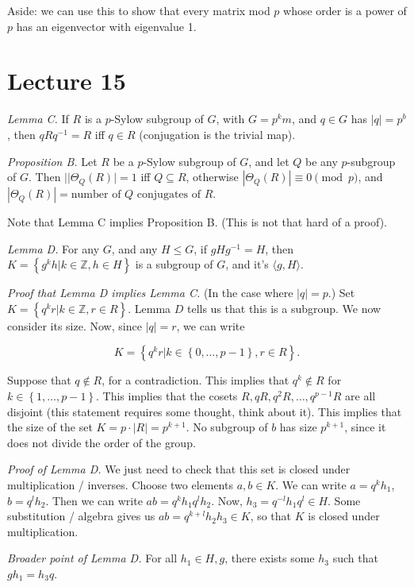 \documentclass[12pt]{article}
\def\ZZ{\mathbb{Z}}
\begin{document}
Aside: we can use this to show that every matrix mod $p$ whose order is a power of $p$ has an eigenvector with eigenvalue 1.

\section{Lecture 15}

{\it Lemma C.} If $R$ is a $p$-Sylow subgroup of $G$, with $G = p^k m$, and $q \in G$ has $|q| = p^b$, then $qRq^{-1} = R$ iff $q \in R$ (conjugation is the trivial map).

{\it Proposition B.} Let $R$ be a $p$-Sylow subgroup of $G$, and let $Q$ be any $p$-subgroup of $G$.  Then $||\Theta_Q(R)| = 1$ iff $Q \subseteq R$, otherwise $|\Theta_Q(R)| \equiv 0 \pmod{p}$, and $|\Theta_Q (R)| = \text{number of $Q$ conjugates of $R$}.$

Note that Lemma C implies Proposition B.  (This is not that hard of a proof).

{\it Lemma D.} For any $G$, and any $H \leq G$, if $gHg^{-1} = H$, then $K = \left\{ g^k h | k \in \ZZ, h \in H \right\}$ is a subgroup of $G$, and it's $\langle g, H \rangle$.

{\it Proof that Lemma D implies Lemma C.} (In the case where $|q| = p$.) Set $K = \left\{ q^k r | k \in \ZZ, r \in R \right\}$.  Lemma $D$ tells us that this is a subgroup.  We now consider its size.  Now, since $|q| = r$, we can write

\[
  K = \left\{ q^k r | k \in \left\{ 0, \dots, p-1 \right\}, r \in R \right\}.
\]

Suppose that $q \not \in R$, for a contradiction.  This implies that $q^k \not \in R$ for $k \in \left\{ 1, \dots, p-1 \right\}$.  This implies that the cosets $R, qR, q^2 R, \dots, q^{p-1} R$ are all disjoint (this statement requires some thought, think about it).  This implies that the size of the set $K = p \cdot |R| = p^{k+1}$.  No subgroup of $b$ has size $p^{k+1}$, since it does not divide the order of the group.

{\it Proof of Lemma D.} We just need to check that this set is closed under multiplication / inverses.  Choose two elements $a, b \in K$.  We can write $a = q^k h_1$, $b = q^l h_2$.  Then we can write $a b = q^k h_1 q^l h_2$.  Now, $h_3 = q^{-l} h_1 q^l \in H$.  Some substitution / algebra gives us $ab = q^{k +l} h_2 h_3 \in K$, so that $K$ is closed under multiplication. 

{\it Broader point of Lemma D.} For all $h_1 \in H, g$, there exists some $h_3$ such that $g h_1 = h_3 q$.
\end{document}
